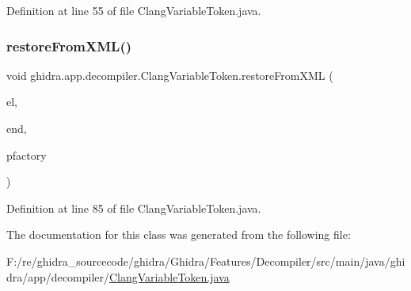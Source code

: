 Definition at line 55 of file Clang\+Variable\+Token.\+java.

\mbox{\label{classghidra_1_1app_1_1decompiler_1_1_clang_variable_token_ae368d27217523fd89248402ee45a61a6}} 
\subsubsection{\texorpdfstring{restoreFromXML()}{restoreFromXML()}}
{\footnotesize\ttfamily void ghidra.\+app.\+decompiler.\+Clang\+Variable\+Token.\+restore\+From\+X\+ML (\begin{DoxyParamCaption}\item[{Xml\+Element}]{el,  }\item[{Xml\+Element}]{end,  }\item[{Pcode\+Factory}]{pfactory }\end{DoxyParamCaption})\hspace{0.3cm}{\ttfamily [inline]}}



Definition at line 85 of file Clang\+Variable\+Token.\+java.



The documentation for this class was generated from the following file\+:\begin{DoxyCompactItemize}
\item 
F\+:/re/ghidra\+\_\+sourcecode/ghidra/\+Ghidra/\+Features/\+Decompiler/src/main/java/ghidra/app/decompiler/\mbox{\hyperlink{_clang_variable_token_8java}{Clang\+Variable\+Token.\+java}}\end{DoxyCompactItemize}
